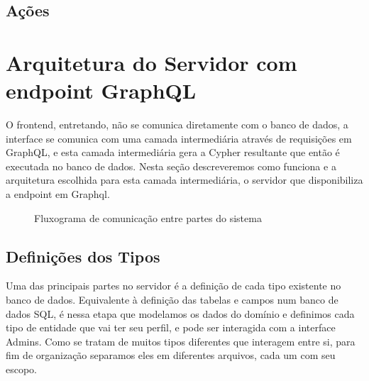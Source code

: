 \subsection{Ações}

\section{Arquitetura do Servidor com endpoint GraphQL}

O frontend, entretando, não se comunica diretamente com o banco de dados, a interface se comunica com uma camada intermediária através de requisições em GraphQL, e esta camada intermediária gera a Cypher resultante que então é executada no banco de dados. Nesta seção descreveremos como funciona e a arquitetura escolhida para esta camada intermediária, o servidor que disponibiliza a endpoint em Graphql.

 \begin{figure}[H]

\caption{Fluxograma de comunicação entre partes do sistema }
\label{chap3:fluxograma}
\end{figure}

\subsection{Definições dos Tipos}

Uma das principais partes no servidor é a definição de cada tipo existente no banco de dados. Equivalente à definição das tabelas e campos num banco de dados SQL, é nessa etapa que modelamos os dados do domínio e definimos cada tipo de entidade que vai ter seu perfil, e pode ser interagida com a interface Admins.
Como se tratam de muitos tipos diferentes que interagem entre si, para fim de organização separamos eles em diferentes arquivos, cada um com seu escopo.

